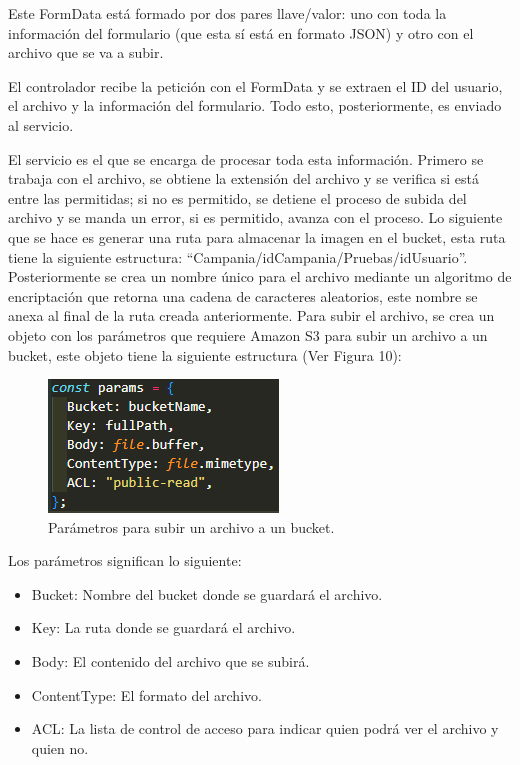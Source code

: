 Este FormData está formado por dos pares llave/valor: uno con toda la información del formulario (que esta sí está en formato JSON) y otro con el archivo que se va a subir.

El controlador recibe la petición con el FormData y se extraen el ID del usuario, el archivo y la información del formulario. Todo esto, posteriormente, es enviado al servicio.

El servicio es el que se encarga de procesar toda esta información. Primero se trabaja con el archivo, se obtiene la extensión del archivo y se verifica si está entre las permitidas; si no es permitido, se detiene el proceso de subida del archivo y se manda un error, si es permitido, avanza con el proceso. Lo siguiente que se hace es generar una ruta para almacenar la imagen en el bucket, esta ruta tiene la siguiente estructura: ``Campania/idCampania/Pruebas/idUsuario''. Posteriormente se crea un nombre único para el archivo mediante un algoritmo de encriptación que retorna una cadena de caracteres aleatorios, este nombre se anexa al final de la ruta creada anteriormente. Para subir el archivo, se crea un objeto con los parámetros que requiere Amazon S3 para subir un archivo a un bucket, este objeto tiene la siguiente estructura (Ver Figura 10):

    \begin{figure}[H]
        \begin{center}
            \includegraphics[scale=0.85]{img/actividades/detalles-campanias/params-as3.png}
            \caption{Parámetros para subir un archivo a un bucket.}
            \label{fig:params-as3}
        \end{center}
    \end{figure}

Los parámetros significan lo siguiente: 
    \begin{itemize}
        \item Bucket: Nombre del bucket donde se guardará el archivo.
        \item Key: La ruta donde se guardará el archivo.
        \item Body: El contenido del archivo que se subirá.
        \item ContentType: El formato del archivo.
        \item ACL: La lista de control de acceso para indicar quien podrá ver el archivo y quien no.
    \end{itemize}

